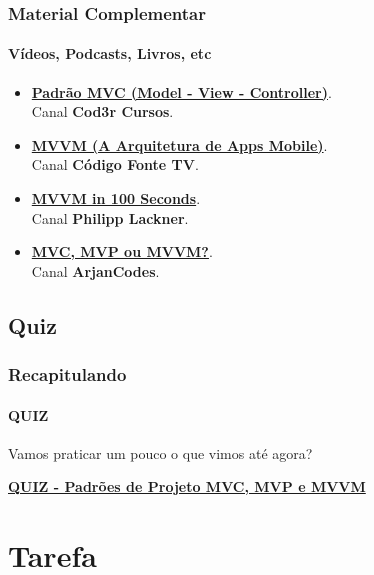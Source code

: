 \documentclass[
	9pt, %
	t, %
]{beamer}
\newcommand{\iconLink}[2]{\href{#1}{\faLink \hspace{0.2em} {#2}}}
\begin{document}
\begin{frame}
	\frametitle{Material Complementar}
	\framesubtitle{Vídeos, Podcasts, Livros, etc}
	
	\begin{itemize}
		\item \iconLink{https://youtu.be/mMDt9g7bMjk}{\textbf{Padrão MVC (Model - View - Controller)}}.\\Canal \textbf{Cod3r Cursos}.\\
		\item \iconLink{https://youtu.be/B2pJWtSyVFA}{\textbf{MVVM (A Arquitetura de Apps Mobile)}}.\\Canal \textbf{Código Fonte TV}.\\
		\item \iconLink{https://www.youtube.com/watch?v=-xTqfilaYow}{\textbf{MVVM in 100 Seconds}}.\\Canal \textbf{Philipp Lackner}.\\
		\item \iconLink{https://www.youtube.com/watch?v=eHhXoCNCI1c}{\textbf{MVC, MVP ou MVVM?}}.\\Canal \textbf{ArjanCodes}.\\
	\end{itemize}
	
\end{frame}

\subsection{Quiz}

\begin{frame}
	\frametitle{Recapitulando}
	\framesubtitle{QUIZ}

	Vamos praticar um pouco o que vimos até agora?
	\vfill

	\bigskip
	\centering

	\iconLink{https://quizizz.com/admin/quiz/659d7e449a88c830fdf1801c?source=quiz_share}{\textbf{QUIZ - Padrões de Projeto MVC, MVP e MVVM}}
	\vfill
		
\end{frame}


\section{Tarefa}
\end{document}
